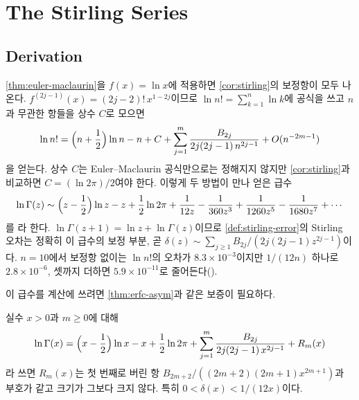 \section{The Stirling Series}
\label{sec:stirling-series}

\subsection{Derivation}

\cref{thm:euler-maclaurin}을 $f(x)=\ln x$에 적용하면 \cref{cor:stirling}의 보정항이 모두 나온다. $f^{(2j-1)}(x)=(2j-2)!\,x^{1-2j}$이므로 $\ln n!=\sum_{k=1}^n\ln k$에 공식을 쓰고 $n$과 무관한 항들을 상수 $C$로 모으면
\[
\ln n!=\Bigl(n+\frac12\Bigr)\ln n-n+C+\sum_{j=1}^{m}\frac{B_{2j}}{2j(2j-1)\,n^{2j-1}}+O(n^{-2m-1})
\]
을 얻는다. 상수 $C$는 Euler--Maclaurin 공식만으로는 정해지지 않지만 \cref{cor:stirling}과 비교하면 $C=(\ln2\pi)/2$여야 한다. 이렇게 두 방법이 만나 얻은 급수
\[
\ln\Gamma(z)\sim\Bigl(z-\frac12\Bigr)\ln z-z+\frac12\ln2\pi+\frac{1}{12z}-\frac{1}{360z^3}+\frac{1}{1260z^5}-\frac{1}{1680z^7}+\cdots
\]
를 라 한다. $\ln\Gamma(z+1)=\ln z+\ln\Gamma(z)$이므로 \cref{def:stirling-error}의 Stirling 오차는 정확히 이 급수의 보정 부분, 곧 $\delta(z)\sim\sum_{j\ge1}B_{2j}/(2j(2j-1)z^{2j-1})$이다. $n=10$에서 보정항 없이는 $\ln n!$의 오차가 $8.3\times10^{-3}$이지만 $1/(12n)$ 하나로 $2.8\times10^{-6}$, 셋까지 더하면 $5.9\times10^{-11}$로 줄어든다().

이 급수를 계산에 쓰려면 \cref{thm:erfc-asym}과 같은 보증이 필요하다.

\begin{theorem}
\label{thm:stirling-remainder}
실수 $x>0$과 $m\ge0$에 대해
\[
\ln\Gamma(x)=\Bigl(x-\frac12\Bigr)\ln x-x+\frac12\ln2\pi+\sum_{j=1}^{m}\frac{B_{2j}}{2j(2j-1)\,x^{2j-1}}+R_m(x)
\]
라 쓰면 $R_m(x)$는 첫 번째로 버린 항 $B_{2m+2}/((2m+2)(2m+1)x^{2m+1})$과 부호가 같고 크기가 그보다 크지 않다. 특히 $0<\delta(x)<1/(12x)$이다.
\end{theorem}

